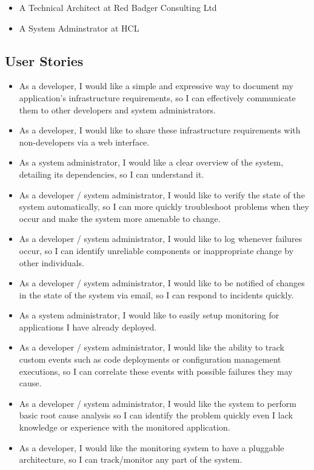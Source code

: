 \documentclass{cshonours}
\begin{document}
\begin{itemize}
  \item A Technical Architect at Red Badger Consulting Ltd
  \item A System Adminstrator at HCL
\end{itemize}

\subsection{User Stories}
\begin{itemize}
  \item As a developer, I would like a simple and expressive way to document my application's infrastructure requirements, so I can effectively communicate them to other developers and system administrators.
  \item As a developer, I would like to share these infrastructure requirements with non-developers via a web interface. 
  \item As a system administrator, I would like a clear overview of the system, detailing its dependencies, so I can understand it.
  \item As a developer / system administrator, I would like to verify the state of the system automatically, so I can more quickly troubleshoot problems when they occur and make the system more amenable to change.
  \item As a developer / system administrator, I would like to log whenever failures occur, so I can identify unreliable components or inappropriate change by other individuals. 
  \item As a developer / system administrator, I would like to be notified of changes in the state of the system via email, so I can respond to incidents quickly.
  \item As a system administrator, I would like to easily setup monitoring for applications I have already deployed.
  \item As a developer / system administrator, I would like the ability to track custom events such as code deployments or configuration management executions, so I can correlate these events with possible failures they may cause.
  \item As a developer / system administrator, I would like the system to perform basic root cause analysis so I can identify the problem quickly even I lack knowledge or experience with the monitored application.
  \item As a developer, I would like the monitoring system to have a pluggable architecture, so I can track/monitor any part of the system. 
\end{itemize}
\end{document}

